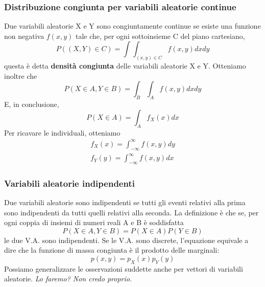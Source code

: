 \documentclass[11pt]{article}
\begin{document}
\subsubsection{Distribuzione congiunta per variabili aleatorie continue}
Due variabili aleatorie X e Y sono congiuntamente continue se esiste una funzione non negativa $f(x,y)$ tale che, per ogni sottoinsieme C del piano cartesiano,
\begin{displaymath}
    P((X,Y)\in C) = \int\int_{(x,y)\in C} f(x,y)dxdy
\end{displaymath}
questa è detta \textbf{densità congiunta} delle variabili aleatorie X e Y.
Otteniamo inoltre che
\begin{displaymath}
    P(X \in A, Y \in B) = \int_B\int_A f(x,y)dxdy
\end{displaymath} 
E, in conclusione,
\begin{displaymath}
    P(X \in A) = \int_A f_X(x) dx
\end{displaymath}
Per ricavare le individuali, otteniamo
\begin{gather*}
    f_X(x) =\int_{-\infty}^\infty f(x,y) dy\\
    f_Y(y) =\int_{-\infty}^\infty f(x,y) dx
\end{gather*}
\subsubsection{Variabili aleatorie indipendenti}
Due variabili aleatorie sono indipendenti se tutti gli eventi relativi alla prima sono indipendenti da tutti quelli relativi alla seconda. 
La definizione è che se, per ogni coppia di insiemi di numeri reali A e B è soddisfatta
\begin{displaymath}
    P(X \in A, Y \in B) = P(X\in A)P(Y \in B)
\end{displaymath}
le due V.A. sono indipendenti. 
Se le V.A. sono discrete, l'equazione equivale a dire che la funzione di massa congiunta è il prodotto delle marginali:
\begin{displaymath}
    p(x,y) = p_X(x) p_Y(y)
\end{displaymath}
Possiamo generalizzare le osservazioni suddette anche per vettori di variabili aleatorie. \textit{Lo faremo? Non credo proprio.}
\end{document}
